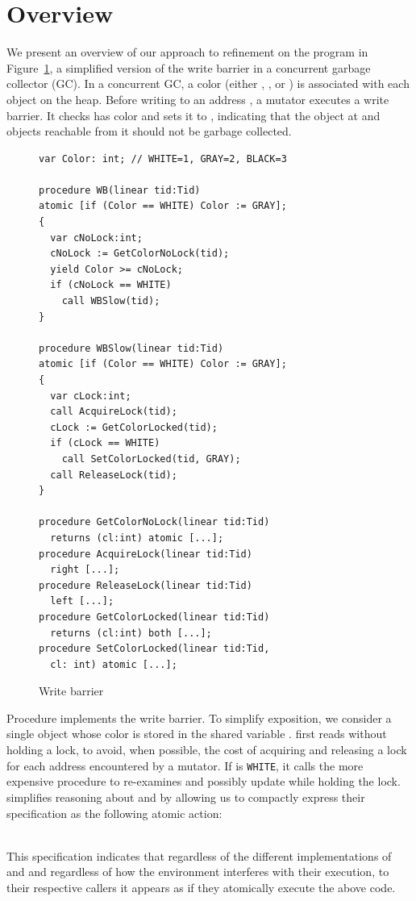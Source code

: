 \section{Overview}
\label{sec:overview}

We present an overview of our approach to refinement on the program in Figure~\ref{fig:reft},
a simplified version of the write barrier in a concurrent garbage collector (GC).
In a concurrent GC, a color (either , , or )
is associated with each object on the heap.  
Before writing to an address , a mutator executes a write
barrier. It checks 
 has color 
and sets it to , indicating that the object at 
and objects reachable from it should not be garbage collected. 

\begin{figure}
{\scriptsize
\begin{verbatim}
var Color: int; // WHITE=1, GRAY=2, BLACK=3

procedure WB(linear tid:Tid)
atomic [if (Color == WHITE) Color := GRAY];
{
  var cNoLock:int;
  cNoLock := GetColorNoLock(tid);
  yield Color >= cNoLock;
  if (cNoLock == WHITE) 
    call WBSlow(tid);
}

procedure WBSlow(linear tid:Tid)
atomic [if (Color == WHITE) Color := GRAY];
{
  var cLock:int;
  call AcquireLock(tid);
  cLock := GetColorLocked(tid);
  if (cLock == WHITE) 
    call SetColorLocked(tid, GRAY);
  call ReleaseLock(tid);
}

procedure GetColorNoLock(linear tid:Tid) 
  returns (cl:int) atomic [...];
procedure AcquireLock(linear tid:Tid) 
  right [...];
procedure ReleaseLock(linear tid:Tid) 
  left [...];
procedure GetColorLocked(linear tid:Tid) 
  returns (cl:int) both [...];
procedure SetColorLocked(linear tid:Tid, 
  cl: int) atomic [...];
\end{verbatim}
}
\caption{Write barrier}
\label{fig:reft}
\end{figure}

Procedure  implements the write barrier.
To simplify exposition, 
we consider a single object whose color is stored in the shared variable .
 first reads  without holding a lock, to avoid,
when possible, the
cost of acquiring and releasing a lock for each address encountered by
a mutator. 
If  is {\tt WHITE}, it calls the more expensive procedure  
to re-examines and possibly update  while holding the lock.
\civl simplifies reasoning about  and  by allowing us to 
compactly express their specification as the following atomic action:\\
\begin{small}
\begin{tt}
[if (Color == WHITE)  Color := GRAY]
\end{tt}
\end{small}\\
This specification indicates that regardless of the different implementations of 
 and  and regardless of how the environment interferes
with their execution, to their respective callers it appears as if they atomically execute the above code.

